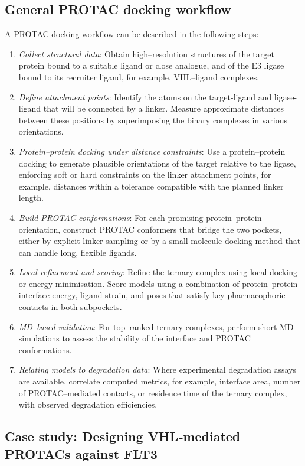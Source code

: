\documentclass[12pt]{article}
\begin{document}
\subsection{General PROTAC docking workflow}

A PROTAC docking workflow can be described in the following steps:

\begin{enumerate}
  \item \emph{Collect structural data}: Obtain high–resolution structures of the target protein bound to a suitable ligand or close analogue, and of the E3 ligase bound to its recruiter ligand, for example, VHL–ligand complexes.  
  \item \emph{Define attachment points}: Identify the atoms on the target-ligand and ligase-ligand that will be connected by a linker. Measure approximate distances between these positions by superimposing the binary complexes in various orientations.  
  \item \emph{Protein–protein docking under distance constraints}: Use a protein–protein docking to generate plausible orientations of the target relative to the ligase, enforcing soft or hard constraints on the linker attachment points, for example, distances within a tolerance compatible with the planned linker length.  
  \item \emph{Build PROTAC conformations}: For each promising protein–protein orientation, construct PROTAC conformers that bridge the two pockets, either by explicit linker sampling or by a small molecule docking method that can handle long, flexible ligands.  
  \item \emph{Local refinement and scoring}: Refine the ternary complex using local docking or energy minimisation. Score models using a combination of protein–protein interface energy, ligand strain, and poses that satisfy key pharmacophoric contacts in both subpockets.  
  \item \emph{MD–based validation}: For top–ranked ternary complexes, perform short MD simulations to assess the stability of the interface and PROTAC conformations.  
  \item \emph{Relating models to degradation data}: Where experimental degradation assays are available, correlate computed metrics, for example, interface area, number of PROTAC–mediated contacts, or residence time of the ternary complex, with observed degradation efficiencies.
\end{enumerate}


\subsection{Case study: Designing VHL‐mediated PROTACs against FLT3}
\end{document}
